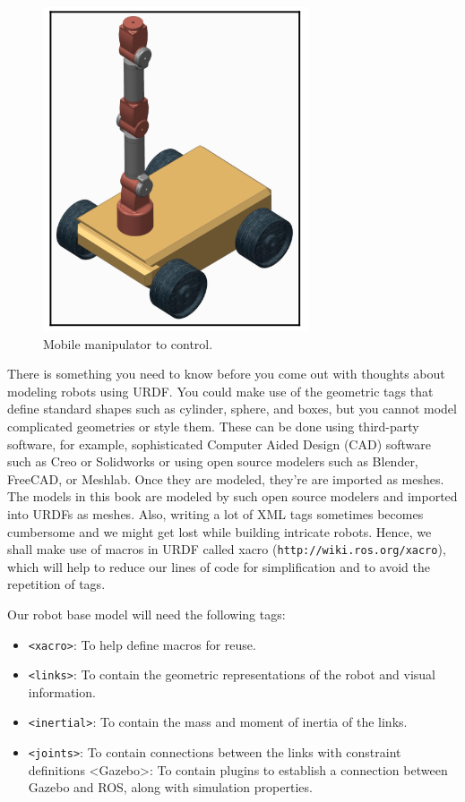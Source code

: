 \documentclass[letterpaper,pdftex]{article}
\begin{document}
\begin{figure}
\centering
\includegraphics[scale=0.5]{render_robot.png}
\caption{Mobile manipulator to control.}
\end{figure}

There is something you need to know before you come out with thoughts about modeling robots using URDF. You could make use of the geometric tags that define standard shapes such as cylinder, sphere, and boxes, but you cannot model complicated geometries or style them. These can be done using third-party software, for example, sophisticated Computer Aided Design (CAD) software such as Creo or Solidworks or using open source modelers such as Blender, FreeCAD, or Meshlab. Once they are modeled, they're are imported as meshes. The models in this book are modeled by such open source modelers and imported into URDFs as meshes. Also, writing a lot of XML tags sometimes becomes cumbersome and we might get lost while building intricate robots. Hence, we shall make use of macros in URDF called xacro (\verb|http://wiki.ros.org/xacro|), which will help to reduce our lines of code for simplification and to avoid the repetition of tags.

Our robot base model will need the following tags:
\begin{itemize}
\item \verb|<xacro>|: To help define macros for reuse.
\item \verb|<links>|: To contain the geometric representations of the robot and visual information.
\item \verb|<inertial>|: To contain the mass and moment of inertia of the links.
\item \verb|<joints>|: To contain connections between the links with constraint definitions <Gazebo>: To contain plugins to establish a connection between Gazebo and ROS, along with simulation properties.

\end{itemize}
\end{document}
